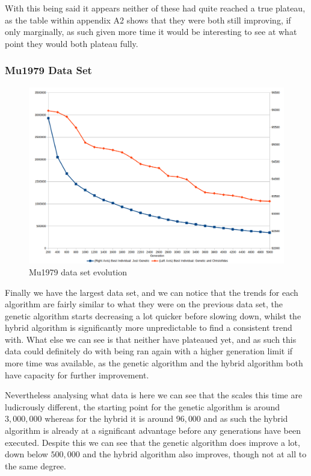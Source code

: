 \documentclass[11pt,a4paper,titlepage]{article}
\begin{document}
With this being said it appears neither of these had quite reached a true plateau, as the table within appendix A2 shows that they were both still improving, if only marginally, as such given more time it would be interesting to see at what point they would both plateau fully.

\subsubsection{Mu1979 Data Set}

\begin{figure}[ht]
	\includegraphics[width=\textwidth]{mu1979Evolution}
	\centering
	\caption{Mu1979 data set evolution}
\end{figure}

Finally we have the largest data set, and we can notice that the trends for each algorithm are fairly similar to what they were on the previous data set, the genetic algorithm starts decreasing a lot quicker before slowing down, whilst the hybrid algorithm is significantly more unpredictable to find a consistent trend with. What else we can see is that neither have plateaued yet, and as such this data could definitely do with being ran again with a higher generation limit if more time was available, as the genetic algorithm and the hybrid algorithm both have capacity for further improvement.

Nevertheless analysing what data is here we can see that the scales this time are ludicrously different, the starting point for the genetic algorithm is around $3,000,000$ whereas for the hybrid it is around $96,000$ and as such the hybrid algorithm is already at a significant advantage before any generations have been executed. Despite this we can see that the genetic algorithm does improve a lot, down below $500,000$ and the hybrid algorithm also improves, though not at all to the same degree.
\end{document}
